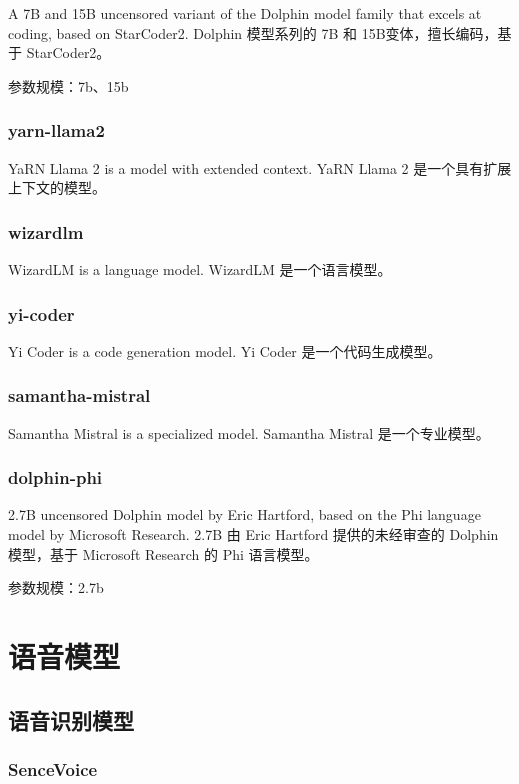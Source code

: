 \documentclass[12pt,UTF8]{ctexbook}
\begin{document}
A 7B and 15B uncensored variant of the Dolphin model family that excels at coding, based on StarCoder2.
Dolphin 模型系列的 7B 和 15B变体，擅长编码，基于 StarCoder2。

参数规模：7b、15b

\subsection{yarn-llama2}

YaRN Llama 2 is a model with extended context.
YaRN Llama 2 是一个具有扩展上下文的模型。

\subsection{wizardlm}

WizardLM is a language model.
WizardLM 是一个语言模型。

\subsection{yi-coder}

Yi Coder is a code generation model.
Yi Coder 是一个代码生成模型。

\subsection{samantha-mistral}

Samantha Mistral is a specialized model.
Samantha Mistral 是一个专业模型。

\subsection{dolphin-phi}

2.7B uncensored Dolphin model by Eric Hartford, based on the Phi language model by Microsoft Research.
2.7B 由 Eric Hartford 提供的未经审查的 Dolphin 模型，基于 Microsoft Research 的 Phi 语言模型。

参数规模：2.7b

\chapter{语音模型}

\section{语音识别模型}

\subsection{SenceVoice}
\end{document}
